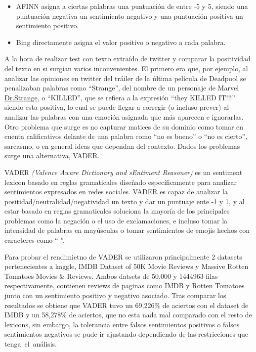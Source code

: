 \documentclass[
  letterpaper,
  DIV=11,
  numbers=noendperiod]{scrartcl}
\begin{document}
\begin{itemize}
\item
  AFINN asigna a ciertas palabras una puntuación de entre -5 y 5, siendo
  una puntuación negativa un sentimiento negativo y una puntuación
  positiva un sentimiento positivo.
\item
  Bing directamente asigna el valor positivo o negativo a cada palabra.
\end{itemize}

A la hora de realizar test con texto extraído de twitter y comparar la
positividad del texto en si surgían varios inconvenientes. El primero
era que, por ejemplo, al analizar las opiniones en twitter del tráiler
de la última película de Deadpool se penalizaban palabras como
``Strange'', del nombre de un personaje de Marvel
\underline{Dr.Strange}, o ``KILLED'', que se refiera a la expresión
``they KILLED IT!!!'' siendo esta positiva, lo cual se puede llegar a
corregir (o incluso prever) al analizar las palabras con una emoción
asignada que más aparecen e ignorarlas. Otro problema que surge es no
capturar matices de su dominio como tomar en cuenta calificativos
delante de una palabra como ``no es bueno'' o ``no es cierto'',
sarcasmo, o en general ideas que dependan del contexto. Dados los
problemas surge una alternativa, VADER.

VADER \emph{(Valence Aware Dictionary and sEntiment Reasoner)} es un
sentiment lexicon basado en reglas gramaticales diseñado específicamente
para analizar sentimientos expresados en redes sociales. VADER es capaz
de analizar la positidad/neutralidad/negatividad un texto y dar un
puntuaje ente -1 y 1, y al estar basado en reglas gramaticales soluciona
la mayoría de los principales problemas como la negación o el uso de
exclamaciones, e incluso tomar la intensidad de palabras en mayúsculas o
tomar sentimientos de emojis hechos con caracteres como `` \text{:(} ''.

Para probar el rendimietno de VADER se utilizaron principalmente 2
datasets pertenecientes a kaggle, IMDB Dataset of 50K Movie Reviews y
Massive Rotten Tomatoes Movies \& Reviews. Ambos datsets de 50.000 y
1444963 filas respectivamente, contienen reviews de paginas como IMDB y
Rotten Tomatoes junto con un sentimiento positivo y negativo asociado.
Tras comparar los resultados se obtiene que VADER tuvo un 69,226\% de
aciertos con el dataset de IMDB y un 58,278\% de aciertos, que no esta
nada mal comparado con el resto de lexicons, sin embargo, la tolerancia
entre falsos sentimientos positivos o falsos sentimientos negativos se
pude ir ajustando dependiendo de las restricciones que
tenga~el~análisis.
\end{document}
